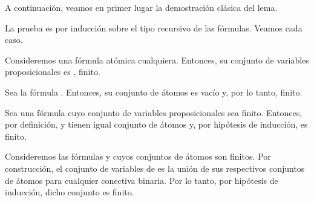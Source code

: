 \begin{isabellebody}
\begin{isamarkuptext}
  A continuación, veamos en primer lugar la demostración clásica del 
  lema. 

  \begin{demostracion}
  La prueba es por inducción sobre el tipo recursivo de las fórmulas. 
  Veamos cada caso.
  
  Consideremos una fórmula atómica  cualquiera. Entonces, 
  su conjunto de variables proposicionales es , finito.

  Sea la fórmula \isa{{\isasymbottom}}. Entonces, su conjunto de átomos es vacío y, por 
  lo tanto, finito.
  
  Sea  una fórmula cuyo conjunto de variables proposicionales sea 
  finito. Entonces, por definición,  y  tienen igual conjunto de
  átomos y, por hipótesis de inducción, es finito.

  Consideremos las fórmulas  y  cuyos conjuntos de átomos son 
  finitos. Por construcción, el conjunto de variables de  es la 
  unión de sus respectivos conjuntos de átomos para cualquier \isa{{\isacharasterisk}} 
  conectiva binaria. Por lo tanto, por hipótesis de inducción, 
  dicho conjunto es finito. 
  \end{demostracion} 


\end{isamarkuptext}
\end{isabellebody}
